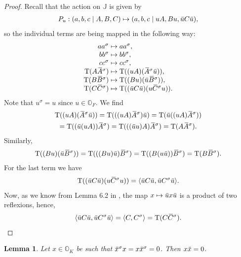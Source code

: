 \documentclass{amsart}
\def\ovA{\mathord{\mbox{\hspace*{0pt}}\,\overline{\!A\!\!\;}\!\:}\mbox{\hspace*{0pt}}}
\def\ovB{\mathord{\mbox{\hspace*{0pt}}\,\overline{\!B\!\!\;}\!\:}\mbox{\hspace*{0pt}}}
\def\ovC{\mathord{\mbox{\hspace*{0pt}}\,\overline{\!C\!\!\;}\!\:}\mbox{\hspace*{0pt}}}
\def\ovu{\mathord{\mbox{\hspace*{0pt}}\,\overline{\!u\!\!\;}\!\:}\mbox{\hspace*{0pt}}}
\def\ovx{\mathord{\mbox{\hspace*{0pt}}\,\overline{\!x\!\!\;}\!\:}\mbox{\hspace*{0pt}}}
\def\OO{\mathord{\mathbb{O}}}
\newcommand{\Tr}{\operatorname{T}}
\newcommand{\J}{\mathbb{J}}
\newcommand{\s}{\sigma}
\newcommand{\inner}[2]{\langle #1, #2 \rangle}
\theoremstyle{plain}
\numberwithin{theorem}{section}
\newtheorem{lemma}[theorem]{Lemma}
\theoremstyle{definition}
\begin{document}
\begin{proof}
	Recall that the action on $\J$ is given by
	\begin{equation*}
		\begin{array}{r@{\;}c@{\;}l}
			P_u : (a, b, c \mid A, B, C) & \mapsto & (a, b, c \mid u A, B u, \ovu C \ovu),
		\end{array}
	\end{equation*}
	so the individual terms are being mapped in the following way:
	\begin{equation*}
		\begin{array}{r@{\;}c@{\;}l}
			a a^{\s} & \mapsto & a a^{\s}, \\
			b b^{\s} & \mapsto & b b^{\s}, \\
			c c^{\s} & \mapsto & c c^{\s}, \\
			\Tr( A \ovA^{\s} ) & \mapsto & \Tr( (u A) (\ovA^{\s} \ovu) ), \\
			\Tr( B \ovB^{\s} ) & \mapsto & \Tr( (B u) (\ovu \ovB^{\s}) ), \\
			\Tr( C \ovC^{\s} ) & \mapsto & \Tr( (\ovu C \ovu) (u \ovC^{\s} u) ).
		\end{array}
	\end{equation*}
	Note that $u^{\s} = u$ since $u \in \OO_F$. We find
	\begin{multline*}
		\Tr( (u A) (\ovA^{\s} \ovu) ) = \Tr( ((u A) \ovA^{\s}) \ovu ) = 
		\Tr( \ovu ((u A) \ovA^{\s}) ) \\
		= \Tr( ( \ovu (u A) ) \ovA^{\s} ) = 
		\Tr( ( (\ovu u) A ) \ovA^{\s} ) = \Tr(A \ovA^{\s}).
	\end{multline*}
	Similarly,
	\begin{equation*}
		 \Tr( (B u) (\ovu \ovB^{\s}) ) = \Tr( ((B u) \ovu ) \ovB^{\s} ) = 
		 \Tr( (B (u \ovu) ) \ovB^{\s} ) = \Tr(B \ovB^{\s}).
	\end{equation*}
	For the last term we have
	\begin{equation*}
		\Tr( (\ovu C \ovu) (u \ovC^{\s} u) ) = \inner{\ovu C \ovu}{\ovu C^{\s} \ovu}.
	\end{equation*}
	Now, as we know from Lemma 6.2 in \cite{BSW1}, the map $x \mapsto \ovu x \ovu$ is
	a product of two reflexions, hence,  
	\begin{equation*}
		\inner{\ovu C \ovu}{\ovu C^{\s} \ovu} = \inner{C}{C^{\s}} = \Tr(C\ovC^{\s}).
	\end{equation*}
\end{proof}

\begin{lemma}
	\label{lemma:5_isotropic}
	Let $x \in \OO_K$ be such that $\ovx^{\s} x = x \ovx^{\s} = 0$. Then $x\ovx = 0$.
\end{lemma}
\end{document}
